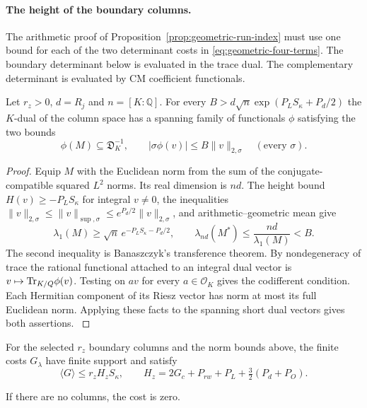 \paragraph{The height of the boundary columns.}
The arithmetic proof of Proposition~\ref{prop:geometric-run-index}
must use one bound for each of the two determinant costs
in \eqref{eq:geometric-four-terms}. The boundary determinant
below is evaluated in the trace dual. The complementary
determinant is evaluated by CM coefficient functionals.
\hypertarget{source-slice-budget}{}
\begin{lemma}
Let \(r_z>0\), \(d=R_j\) and \(n=[K:\mathbb Q]\). For every
\(B>d\sqrt n\exp(P_LS_\kappa+P_d/2)\) the \(K\)-dual of the
column space has a spanning family of functionals \(\phi\) satisfying the two bounds
\[
 \phi(M)\subseteq\mathfrak D_K^{-1},\qquad |\sigma\phi(v)|\le B\|v\|_{2,\sigma}\quad(\text{every }\sigma).
\]

\end{lemma}
\begin{proof}
Equip \(M\) with the Euclidean norm from the sum of the
conjugate-compatible squared \(L^2\) norms. Its real dimension
is \(nd\). The height bound \(H(v)\ge-P_LS_\kappa\) for integral
\(v\ne0\), the inequalities
\(\|v\|_{2,\sigma}\le\|v\|_{\sup,\sigma}
 \le e^{P_d/2}\|v\|_{2,\sigma}\), and arithmetic--geometric mean give
\[
 \lambda_1(M)\ge\sqrt n\,e^{-P_LS_\kappa-P_d/2},\qquad
 \lambda_{nd}(M^*)\le \frac{nd}{\lambda_1(M)}<B .
\]
The second inequality is Banaszczyk's transference theorem.
By nondegeneracy of trace the rational functional attached to
an integral dual vector is \(v\mapsto{\rm Tr}_{K/\mathbb Q}\phi(v)\).
Testing on \(av\) for every \(a\in\mathcal O_K\) gives the
codifferent condition. Each Hermitian component of its Riesz
vector has norm at most its full Euclidean norm. Applying these
facts to the spanning short dual vectors gives both assertions.
\cite{banaszczyk}\label{cor:slice-budget-1}
\end{proof}

\begin{proposition}\label{prop:slice-boundary-determinant-cost}
For the selected \(r_z\) boundary columns and the norm bounds
above, the finite costs \(G_\lambda\) have finite support and satisfy
\[
 \langle G\rangle\le r_z H_z S_\kappa,\qquad H_z=2G_c+P_{rw}+P_L+\tfrac32(P_d+P_O).
\]

If there are no columns, the cost is zero.
\end{proposition}

